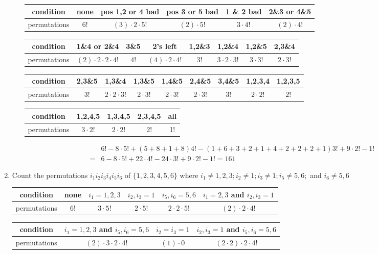 \documentclass{article}
\begin{document}
\begin{enumerate}
\begin{enumerate}
\begin{tabular}{c|c|c|c|c|c}
condition&
none&
pos 1,2 or 4 bad&
pos 3 or 5 bad&
1 \& 2 bad&
2\&3 or 4\&5
\\
\hline
permutations&
6!&
$(3)\cdot2\cdot5!$&
$(2)\cdot5!$&
$3\cdot4!$&
$(2)\cdot4!$
\end{tabular}

\begin{tabular}{c|c|c|c|c|c|c|c}
condition&
1\&4 or 2\&4&
3\&5&
2's left&
1,2\&3&
1,2\&4&
1,2\&5&
2,3\&4
\\
\hline
permutations&
$(2)\cdot2\cdot2\cdot4!$&
$4!$&
$(4)\cdot2\cdot4!$&
$3!$&
$3\cdot2\cdot3!$&
$3\cdot3!$&
$2\cdot3!$
\end{tabular}
\begin{tabular}{c|c|c|c|c|c|c|c|c}
condition&
2,3\&5&
1,3\&4&
1,3\&5&
1,4\&5&
2,4\&5&
3,4\&5&
1,2,3,4&
1,2,3,5
\\
\hline
permutations&
3!&
$2\cdot2\cdot3!$&
$2\cdot3!$&
$2\cdot3!$&
$2\cdot3!$&
$3!$&
$2\cdot2!$&
$2!$
\end{tabular}

\begin{tabular}{c|c|c|c|c}
  condition&
  1,2,4,5&
  1,3,4,5&
  2,3,4,5&
  all
  \\
  \hline
  permutations&
  $3\cdot2!$&
  $2\cdot2!$&
  2!&
  1!
\end{tabular}
\begin{align*}
  &6!-8\cdot5!+(5+8+1+8)4!-(1+6+3+2+1+4+2+2+2+1)3!+9\cdot2!-1!\\
  =&6-8\cdot5!+22\cdot4!-24\cdot3!+9\cdot2!-1!=161
\end{align*}
\end{enumerate}
\setcounter{enumi}{25}
\item
Count the permutations $i_1i_2i_3i_4i_5i_6$ of $\{1,2,3,4,5,6\}$ where $i_1\ne1,2,3;i_2\ne1;i_3\ne1;i_5\ne5,6;$ and $i_6\ne5,6$

\begin{tabular}{c|c|c|c|c|c}
condition&
none&
$i_1=1,2,3$&
$i_2,i_3=1$&
$i_5,i_6=5,6$&
$i_1=2,3$ and $i_2,i_3=1$
\\
\hline
permutations&
$6!$&
$3\cdot5!$&
$2\cdot5!$&
$2\cdot2\cdot5!$&
$(2)\cdot2\cdot4!$
\end{tabular}

\begin{tabular}{c|c|c|c}
condition&
$i_1=1,2,3$ and $i_5,i_6=5,6$&
$i_2=i_3=1$&
$i_2,i_3=1$ and $i_5,i_6=5,6$
\\
\hline
permutations&
$(2)\cdot3\cdot2\cdot4!$&
$(1)\cdot0$&
$(2\cdot2)\cdot2\cdot4!$
\end{tabular}


\end{enumerate}
\end{document}
